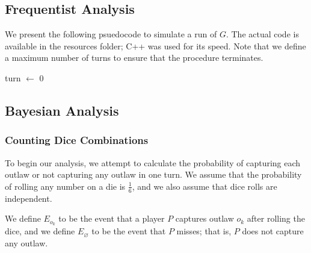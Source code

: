 \documentclass{article}
\theoremstyle{definition}
\theoremstyle{plain}
\begin{document}
	\subsection{Frequentist Analysis}
	We present the following psuedocode to simulate a run of $G$. The actual code is available in the resources folder; C++ was used for its speed. Note that we define a maximum number of turns to ensure that the procedure terminates.
	\begin{algorithm}

	turn $\gets$ 0\\
	\end{algorithm}

	\subsection{Bayesian Analysis}

	\subsubsection{Counting Dice Combinations}
	To begin our analysis, we attempt to calculate the probability of capturing each outlaw or not capturing any outlaw in one turn. We assume that the probability of rolling any number on a die is $\frac{1}{6}$, and we also assume that dice rolls are independent.

	We define $E_{o_k}$ to be the event that a player $P$ captures outlaw $o_k$ after rolling the dice, and we define $E_\varnothing$ to be the event that $P$ misses; that is, $P$ does not capture any outlaw. 
\end{document}
